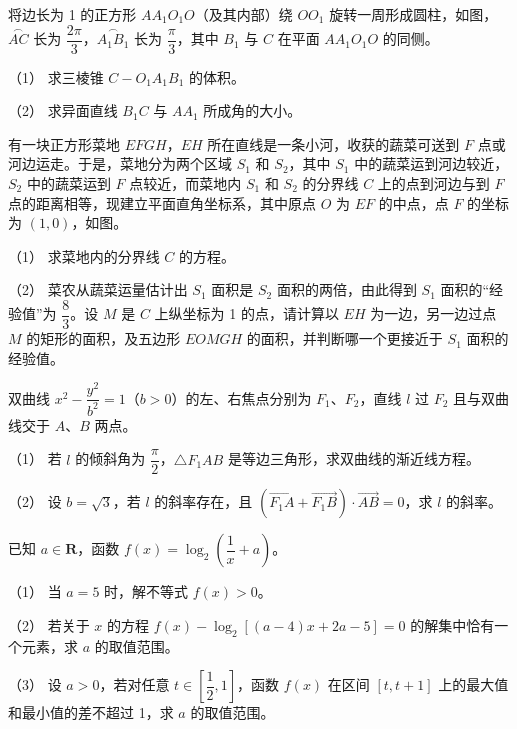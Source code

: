 \Needspace{0.4\textheight}
\begin{question}
将边长为 1 的正方形 \(AA_1O_1O\)（及其内部）绕 \(OO_1\) 旋转一周形成圆柱，如图，\(\overset{\frown}{AC}\) 长为 \(\dfrac{2\pi}{3}\)，\(\overset{\frown}{A_1B_1}\) 长为 \(\dfrac{\pi}{3}\)，其中 \(B_1\) 与 \(C\) 在平面 \(AA_1O_1O\) 的同侧。

（1） 求三棱锥 \(C-O_1A_1B_1\) 的体积。

（2） 求异面直线 \(B_1C\) 与 \(AA_1\) 所成角的大小。
\nopagebreak[4]
\begin{center}\end{center}
\nopagebreak[4]
\Needspace{0.4\textheight}
\end{question}
\begin{question}
有一块正方形菜地 \(EFGH\)，\(EH\) 所在直线是一条小河，收获的蔬菜可送到 \(F\) 点或河边运走。于是，菜地分为两个区域 \(S_1\) 和 \(S_2\)，其中 \(S_1\) 中的蔬菜运到河边较近，\(S_2\) 中的蔬菜运到 \(F\) 点较近，而菜地内 \(S_1\) 和 \(S_2\) 的分界线 \(C\) 上的点到河边与到 \(F\) 点的距离相等，现建立平面直角坐标系，其中原点 \(O\) 为 \(EF\) 的中点，点 \(F\) 的坐标为 \((1,0)\)，如图。

（1） 求菜地内的分界线 \(C\) 的方程。

（2） 菜农从蔬菜运量估计出 \(S_1\) 面积是 \(S_2\) 面积的两倍，由此得到 \(S_1\) 面积的“经验值”为 \(\dfrac{8}{3}\)。设 \(M\) 是 \(C\) 上纵坐标为 1 的点，请计算以 \(EH\) 为一边，另一边过点 \(M\) 的矩形的面积，及五边形 \(EOMGH\) 的面积，并判断哪一个更接近于 \(S_1\) 面积的经验值。
\nopagebreak[4]
\begin{center}\end{center}
\nopagebreak[4]
\end{question}
\begin{question}
双曲线 \(x^2-\dfrac{y^2}{b^2}=1\)（\(b>0\)）的左、右焦点分别为 \(F_1\)、\(F_2\)，直线 \(l\) 过 \(F_2\) 且与双曲线交于 \(A\)、\(B\) 两点。

（1） 若 \(l\) 的倾斜角为 \(\dfrac{\pi}{2}\)，\(\triangle F_1AB\) 是等边三角形，求双曲线的渐近线方程。

（2） 设 \(b=\sqrt{3}\)，若 \(l\) 的斜率存在，且 \(\left(\overrightarrow{F_1A}+\overrightarrow{F_1B}\right)\cdot\overrightarrow{AB}=0\)，求 \(l\) 的斜率。

\end{question}
\begin{question}
已知 \(a\in\mathbf{R}\)，函数 \(f(x)=\log_2\left(\dfrac{1}{x}+a\right)\)。

（1） 当 \(a=5\) 时，解不等式 \(f(x)>0\)。

（2） 若关于 \(x\) 的方程 \(f(x)-\log_2[(a-4)x+2a-5]=0\) 的解集中恰有一个元素，求 \(a\) 的取值范围。

（3） 设 \(a>0\)，若对任意 \(t\in\left[\dfrac{1}{2},1\right]\)，函数 \(f(x)\) 在区间 \([t,t+1]\) 上的最大值和最小值的差不超过 1，求 \(a\) 的取值范围。

\end{question}
